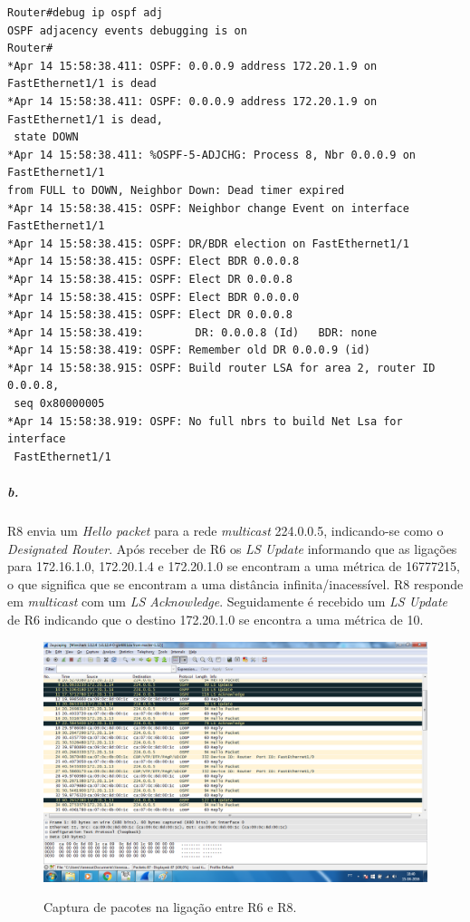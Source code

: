 \begin{verbatim}
Router#debug ip ospf adj 
OSPF adjacency events debugging is on
Router#
*Apr 14 15:58:38.411: OSPF: 0.0.0.9 address 172.20.1.9 on FastEthernet1/1 is dead
*Apr 14 15:58:38.411: OSPF: 0.0.0.9 address 172.20.1.9 on FastEthernet1/1 is dead,
 state DOWN
*Apr 14 15:58:38.411: %OSPF-5-ADJCHG: Process 8, Nbr 0.0.0.9 on FastEthernet1/1 
from FULL to DOWN, Neighbor Down: Dead timer expired
*Apr 14 15:58:38.415: OSPF: Neighbor change Event on interface FastEthernet1/1
*Apr 14 15:58:38.415: OSPF: DR/BDR election on FastEthernet1/1 
*Apr 14 15:58:38.415: OSPF: Elect BDR 0.0.0.8
*Apr 14 15:58:38.415: OSPF: Elect DR 0.0.0.8
*Apr 14 15:58:38.415: OSPF: Elect BDR 0.0.0.0
*Apr 14 15:58:38.415: OSPF: Elect DR 0.0.0.8
*Apr 14 15:58:38.419:        DR: 0.0.0.8 (Id)   BDR: none 
*Apr 14 15:58:38.419: OSPF: Remember old DR 0.0.0.9 (id)
*Apr 14 15:58:38.915: OSPF: Build router LSA for area 2, router ID 0.0.0.8, 
 seq 0x80000005
*Apr 14 15:58:38.919: OSPF: No full nbrs to build Net Lsa for interface 
 FastEthernet1/1
\end{verbatim}

\subparagraph{b.}
\textsf{R8} envia um \emph{Hello packet} para a rede \emph{multicast}
224.0.0.5, indicando-se como o \emph{Designated Router}. Após receber
de \textsf{R6} os \emph{LS Update} informando que as ligações para
172.16.1.0, 172.20.1.4 e 172.20.1.0 se encontram a uma métrica de
16777215, o que significa que se encontram a uma distância
infinita/inacessível. \textsf{R8} responde em \emph{multicast} com um
\emph{LS Acknowledge}. Seguidamente é recebido um \emph{LS Update} de
\textsf{R6} indicando que o destino 172.20.1.0 se encontra a uma
métrica de 10. 

\begin{figure}[h]
\centering
\includegraphics[width=1\textwidth, height=0.45\textheight]{2b.png}
\label{fig:captura R8-R6}
\caption{Captura de pacotes na ligação entre \textsf{R6} e \textsf{R8}.}
\end{figure}


